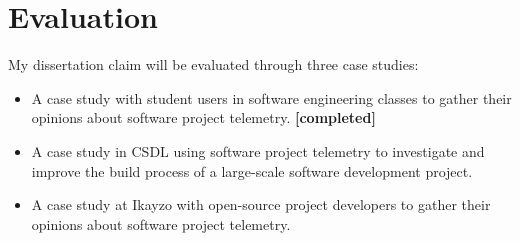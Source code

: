 









\section{Evaluation}  \label{Intro:Evaluation}

My dissertation claim will be evaluated through three case studies:

\begin{itemize}
	\item A case study with student users in software engineering classes to gather their opinions about software project telemetry. \textbf{[completed]}
	\item A case study in CSDL using software project telemetry to investigate and improve the build process of a large-scale software development project.
	\item A case study at Ikayzo with open-source project developers to gather their opinions about software project telemetry.
\end{itemize}



